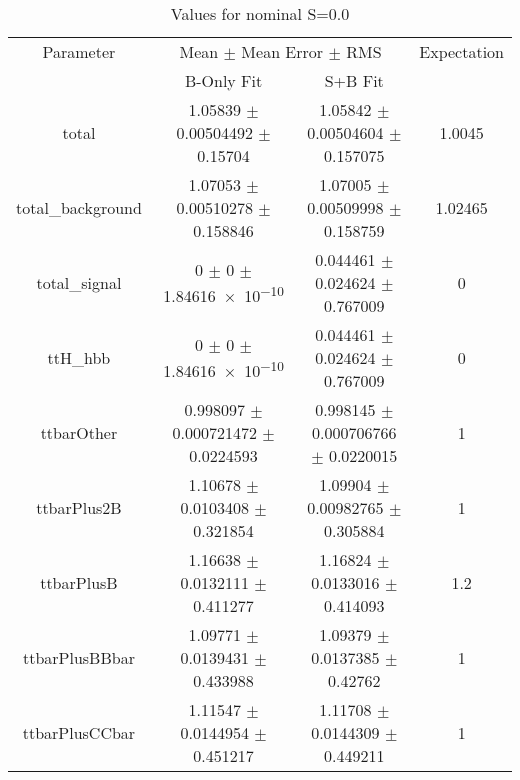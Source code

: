 \begin{table}
\centering
\caption{Values for nominal S=0.0}
\begin{tabular}{cccc}
\toprule
Parameter & \multicolumn{2}{c}{Mean $\pm$ Mean Error $\pm$ RMS} & Expectation\\
 & B-Only Fit & S+B Fit & \\
\midrule
total & \num{1.05839} $\pm$ \num{0.00504492} $\pm$ \num{0.15704} & \num{1.05842} $\pm$ \num{0.00504604} $\pm$ \num{0.157075} & \num{1.0045}\\
total\_background & \num{1.07053} $\pm$ \num{0.00510278} $\pm$ \num{0.158846} & \num{1.07005} $\pm$ \num{0.00509998} $\pm$ \num{0.158759} & \num{1.02465}\\
total\_signal & \num{0} $\pm$ \num{0} $\pm$ \num{1.84616e-10} & \num{0.044461} $\pm$ \num{0.024624} $\pm$ \num{0.767009} & \num{0}\\
ttH\_hbb & \num{0} $\pm$ \num{0} $\pm$ \num{1.84616e-10} & \num{0.044461} $\pm$ \num{0.024624} $\pm$ \num{0.767009} & \num{0}\\
ttbarOther & \num{0.998097} $\pm$ \num{0.000721472} $\pm$ \num{0.0224593} & \num{0.998145} $\pm$ \num{0.000706766} $\pm$ \num{0.0220015} & \num{1}\\
ttbarPlus2B & \num{1.10678} $\pm$ \num{0.0103408} $\pm$ \num{0.321854} & \num{1.09904} $\pm$ \num{0.00982765} $\pm$ \num{0.305884} & \num{1}\\
ttbarPlusB & \num{1.16638} $\pm$ \num{0.0132111} $\pm$ \num{0.411277} & \num{1.16824} $\pm$ \num{0.0133016} $\pm$ \num{0.414093} & \num{1.2}\\
ttbarPlusBBbar & \num{1.09771} $\pm$ \num{0.0139431} $\pm$ \num{0.433988} & \num{1.09379} $\pm$ \num{0.0137385} $\pm$ \num{0.42762} & \num{1}\\
ttbarPlusCCbar & \num{1.11547} $\pm$ \num{0.0144954} $\pm$ \num{0.451217} & \num{1.11708} $\pm$ \num{0.0144309} $\pm$ \num{0.449211} & \num{1}\\
\bottomrule
\end{tabular}
\end{table}